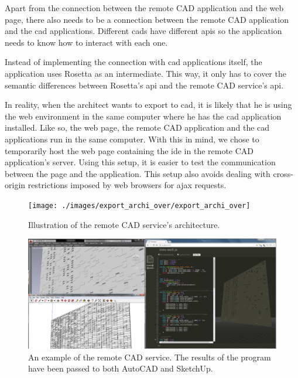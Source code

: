Apart from the connection between the remote CAD application and the web page, there also needs to be a connection between the remote CAD application and the \gls{cad} applications.
Different \glspl{cad} have different \glspl{api} so the application needs to know how to interact with each one.

Instead of implementing the connection with \gls{cad} applications itself, the application uses Rosetta as an intermediate.
This way, it only has to cover the semantic differences between Rosetta's \gls{api} and the remote CAD service's \gls{api}.

In reality, when the architect wants to export to \gls{cad}, it is likely that he is using the web environment in the same computer where he has the \gls{cad} application installed.
Like so, the web page, the remote CAD application and the \gls{cad} applications run in the same computer.
With this in mind, we chose to temporarily host the web page containing the \gls{ide} in the remote CAD application's server.
Using this setup, it is easier to test the communication between the page and the application.
This setup also avoids dealing with cross-origin restrictions imposed by web browsers for \gls{ajax} requests.

\begin{figure}
  \centering
  \texttt{[image: ./images/export\_archi\_over/export\_archi\_over]}
  \caption{Illustration of the remote CAD service's architecture.}
  \label{fig:remote:cad:archi}
\end{figure}


\begin{figure}
  \centering
  \includegraphics[width=1.0\textwidth]{./images/remote_cad_example/remote_cad_example}
  \caption[An example of the remote CAD service.]{An example of the remote CAD service. The results of the program have been passed to both AutoCAD and SketchUp.}
  \label{fig:remote:cad:example}
\end{figure}


